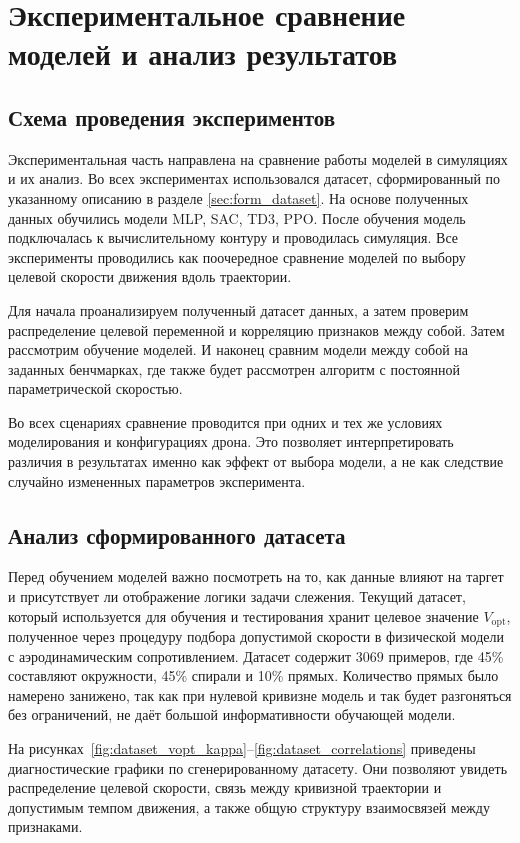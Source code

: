\chapter{Экспериментальное сравнение моделей и анализ результатов}

\section{Схема проведения экспериментов}

Экспериментальная часть направлена на сравнение работы моделей в симуляциях и их анализ.
Во всех экспериментах использовался датасет, сформированный по указанному описанию в разделе \autoref{sec:form_dataset}.
На основе полученных данных обучились модели MLP, SAC, TD3, PPO.
После обучения модель подключалась к вычислительному контуру и проводилась симуляция.
Все эксперименты проводились как поочередное сравнение моделей по выбору целевой скорости движения вдоль траектории.

Для начала проанализируем полученный датасет данных, а затем проверим распределение целевой переменной и корреляцию признаков между собой.
Затем рассмотрим обучение моделей.
И наконец сравним модели между собой на заданных бенчмарках, где также будет рассмотрен алгоритм с постоянной параметрической скоростью.

Во всех сценариях сравнение проводится при одних и тех же условиях моделирования и конфигурациях дрона.
Это позволяет интерпретировать различия в результатах именно как эффект от выбора модели, а не как следствие случайно измененных параметров эксперимента.

\section{Анализ сформированного датасета}

Перед обучением моделей важно посмотреть на то, как данные влияют на таргет и присутствует ли отображение логики задачи слежения.
Текущий датасет, который используется для обучения и тестирования хранит целевое значение $V_{\mathrm{opt}}$, полученное через процедуру подбора допустимой скорости в физической модели с аэродинамическим сопротивлением.
Датасет содержит $3069$ примеров, где 45\% составляют окружности, 45\% спирали и 10\% прямых.
Количество прямых было намерено занижено, так как при нулевой кривизне модель и так будет разгоняться без ограничений, не даёт большой информативности обучающей модели.

На рисунках~\ref{fig:dataset_vopt_kappa}--\ref{fig:dataset_correlations} приведены диагностические графики по сгенерированному датасету.
Они позволяют увидеть распределение целевой скорости, связь между кривизной траектории и допустимым темпом движения, а также общую структуру взаимосвязей между признаками.

